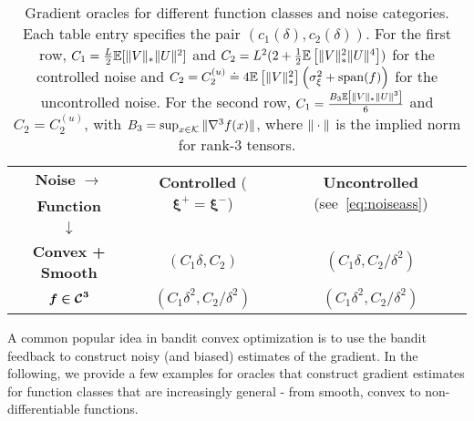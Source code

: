 \begin{table*}
\small
\centering
\begin{tabular}{|c|c|c|}
\toprule
\textbf{Noise }$\bm{ \rightarrow}$ & \multirow{2}{*}{\textbf{Controlled }($\bm{\xi^+ = \xi^-}$)} & \multirow{2}{*}{\textbf{Uncontrolled }(see~\eqref{eq:noiseass})} \\
\textbf{Function } &&\\
$\bm{\downarrow}$ &&\\\midrule
\multirow{2}{*}{\textbf{Convex + Smooth}} & \multirow{2}{*}{$(C_1 \delta, C_2)$} & \multirow{2}{*}{$(C_1\delta, C_2/\delta^2)$}\\
 &&\\\midrule
\multirow{2}{*}{$\bm{f \in \mathcal{C}^3}$} & \multirow{2}{*}{$(C_1 \delta^2, C_2/\delta^2)$} & \multirow{2}{*}{$(C_1 \delta^2, C_2/\delta^2)$} \\
 &&\\\bottomrule
\end{tabular}
\caption{Gradient oracles for different function classes and noise categories. Each table entry specifies the pair $(c_1(\delta), c_2(\delta))$.
For the first row, $C_1 =
\frac{L}{2} \mathbb{E}[ \|V\|_* \|U\|^2]$ and
$C_2 =   L^2 (2 + \frac{1}{2}\mathbb{E}\left[ \|V\|_*^2 \|U\|^4 \right])$
for the controlled noise and
 $C_2 =  C_{2}^{(u)} \doteq 4 \mathbb{E}\left[\|V\|_*^2\right]\left( \sigma_\xi^2+\operatorname{span}(f)\right)$ for the uncontrolled noise.
For the second row, $C_1 = \frac{B_3 \mathbb{E}\left[ \|V\|_* \|U\|^3 \right]}{6}$ and $C_2 =  C_{2}^{(u)}$,
with $B_3 = \sup_{x\in \mathcal{K}} \|\nabla^3 f(x)\|$, where $\|\cdot\|$ is the implied norm for rank-3 tensors.
}
\label{tab:oracles}
\end{table*}
A common popular idea in bandit convex optimization is to use the bandit feedback to construct noisy (and biased) estimates of the gradient.
In the following, we provide a few examples for oracles that construct gradient estimates for function classes that are increasingly general - from smooth, convex to non-differentiable functions.


